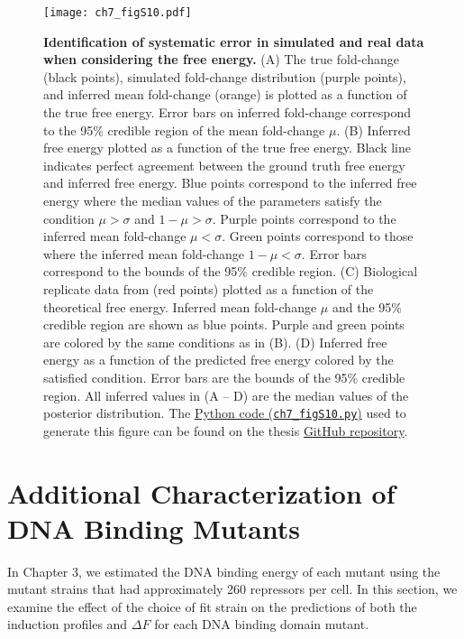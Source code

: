 \documentclass[12pt]{caltech_thesis}
\begin{document}
\hypertarget{fig:empirical_F_error}{%
\begin{figure}
\centering
\texttt{[image: ch7\_figS10.pdf]}
\caption[{Identification of systematic error in simulated and real data
when considering the free energy.}]{\textbf{Identification of systematic
error in simulated and real data when considering the free energy.} (A)
The true fold-change (black points), simulated fold-change distribution
(purple points), and inferred mean fold-change (orange) is plotted as a
function of the true free energy. Error bars on inferred fold-change
correspond to the 95\% credible region of the mean fold-change \(\mu\).
(B) Inferred free energy plotted as a function of the true free energy.
Black line indicates perfect agreement between the ground truth free
energy and inferred free energy. Blue points correspond to the inferred
free energy where the median values of the parameters satisfy the
condition \(\mu > \sigma\) and \(1 - \mu > \sigma\). Purple points
correspond to the inferred mean fold-change \(\mu < \sigma\). Green
points correspond to those where the inferred mean fold-change
\(1 - \mu < \sigma\). Error bars correspond to the bounds of the 95\%
credible region. (C) Biological replicate data from
\textcite{razo-mejia2018} (red points) plotted as a function of the
theoretical free energy. Inferred mean fold-change \(\mu\) and the 95\%
credible region are shown as blue points. Purple and green points are
colored by the same conditions as in (B). (D) Inferred free energy as a
function of the predicted free energy colored by the satisfied
condition. Error bars are the bounds of the 95\% credible region. All
inferred values in (A -- D) are the median values of the posterior
distribution. The
\href{https://github.com/gchure/phd/blob/master/src/chapter_07/code/ch7_figS10.py}{Python
code (\texttt{ch7\_figS10.py})} used to generate this figure can be
found on the thesis \href{https://github.com/gchure/phd}{GitHub
repository}.}
\label{fig:empirical_F_error}
\end{figure}
}

\hypertarget{additional-characterization-of-dna-binding-mutants}{%
\section{Additional Characterization of DNA Binding
Mutants}\label{additional-characterization-of-dna-binding-mutants}}

In Chapter 3, we estimated the DNA binding energy of each mutant using
the mutant strains that had approximately 260 repressors per cell. In
this section, we examine the effect of the choice of fit strain on the
predictions of both the induction profiles and \(\Delta F\) for each DNA
binding domain mutant.
\end{document}
